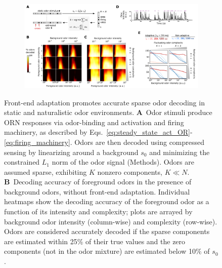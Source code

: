 \documentclass[9pt,twocolumn,twoside,lineno]{pnas-new}
\begin{document}
\begin{figure}[t]
	\centering
	\begin{subfigure}[t]{17.7cm}
		\includegraphics[width=17.7cm]{figures/3_decoding_temporal}
		\label{fig:decoding_a}
	\end{subfigure}
	\begin{subfigure}[t]{0\linewidth}
		\label{fig:decoding_b}
	\end{subfigure}
	\begin{subfigure}[t]{0\linewidth}
		\label{fig:decoding_c}
	\end{subfigure}
	\begin{subfigure}[t]{0\linewidth}
		\label{fig:decoding_d}
	\end{subfigure}
	\begin{subfigure}[t]{0\linewidth}
		\label{fig:decoding_e}
	\end{subfigure}
	\caption{\footnotesize{Front-end adaptation promotes accurate sparse odor decoding in static and naturalistic odor environments.
    \textbf{A}~Odor stimuli produce ORN responses via odor-binding and activation and firing machinery, as described by Eqs.~\ref{eq:steady_state_act_OR}-\ref{eq:firing_machinery}. Odors are then decoded using compressed sensing by linearizing around a background $s_0$ and minimizing the constrained $L_1$ norm of the odor signal (Methods).  Odors are assumed sparse, exhibiting $K$ nonzero components, $K \ll N$. 
    \textbf{B}~Decoding accuracy of foreground odors in the presence of background odors, without front-end adaptation. Individual heatmaps show the decoding accuracy of the foreground odor as a function of its intensity and complexity; plots are arrayed by background odor intensity (column-wise) and complexity (row-wise). Odors are considered accurately decoded if the sparse components are estimated within 25\% of their true values and the zero components (not in the odor mixture) are estimated below 10\% of $s_0$.
}}
\end{figure}
\end{document}
